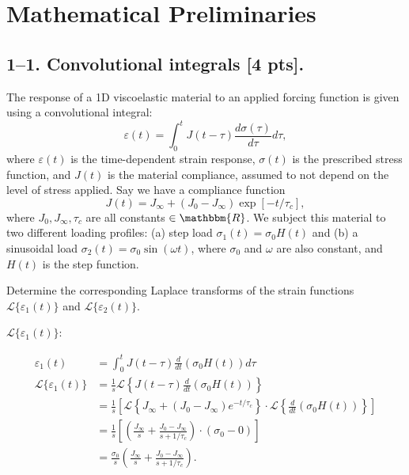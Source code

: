 \section*{Mathematical Preliminaries}

\subsection*{1--1. \textbf{Convolutional integrals} [4 pts].}

The response of a 1D viscoelastic material to an applied forcing function is given using a convolutional integral:
\begin{equation}
    \varepsilon(t) = \int_0^t J(t-\tau) \frac{d\sigma(\tau)}{d\tau} d\tau,
\end{equation}
where $\varepsilon(t)$ is the time-dependent strain response, $\sigma(t)$ is the prescribed stress function, and $J(t)$ is the material compliance, assumed to not depend on the level of stress applied. 
Say we have a compliance function 
\begin{equation}
    J(t) = J_\infty + (J_0-J_\infty)\exp[-t/\tau_c],
\end{equation}
where $J_0, J_\infty, \tau_c$ are all constants $\in \mathbbm{R}$. 
We subject this material to two different loading profiles: (a) step load $\sigma_1(t) = \sigma_0 H(t)$ and (b) a sinusoidal load $\sigma_2(t) = \sigma_0  \sin(\omega t)$, where $\sigma_0$ and $\omega$ are also constant, and $H(t)$ is the step function. 

Determine the corresponding Laplace transforms of the strain functions $\mathcal{L}\{\varepsilon_1(t)\}$ and $\mathcal{L}\{\varepsilon_2(t)\}$.

$\mathcal{L}\{\varepsilon_1(t)\}$:

\begin{align*}
    \varepsilon_1 (t) &= \int_0^t J(t-\tau) \frac{d}{d t}(\sigma_0 H(t)) d\tau \\
    \mathcal{L}\{\varepsilon_1(t)\} &= \frac{1}{s} \mathcal{L} \left\{ J(t-\tau) \frac{d}{dt}(\sigma_0 H(t)) \right\} \\
    &= \frac{1}{s} \left[ \mathcal{L} \left\{ J_\infty + (J_0 - J_\infty) e^{-t/\tau_c}\right\}
    \cdot \mathcal{L} \left\{ \frac{d}{dt}(\sigma_0 H(t)) \right\}\right] \\
    &= \frac{1}{s} \left[ \left( \frac{J_\infty}{s} + \frac{J_0-J_\infty}{s+1/\tau_c} \right)
    \cdot (\sigma_0 - 0) \right] \\
    &= \boxed{\frac{\sigma_0}{s} \left( \frac{J_\infty}{s} + \frac{J_0-J_\infty}{s+1/\tau_c} \right).}
\end{align*}

